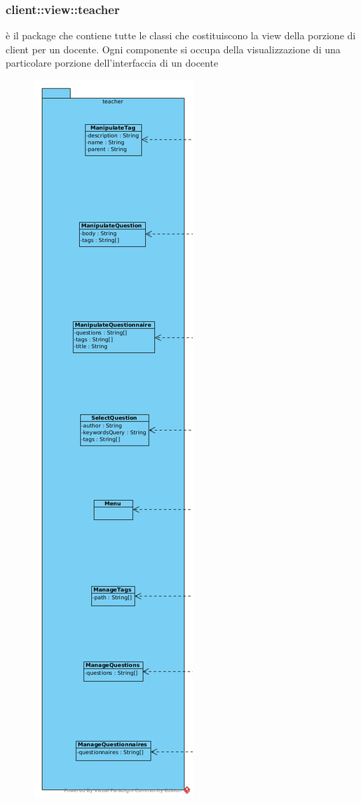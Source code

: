 \subsubsection{client::view::teacher}
è il package che contiene tutte le classi che costituiscono la view della porzione di client per un docente. Ogni componente si occupa della visualizzazione di una particolare porzione dell'interfaccia di un docente\begin{center}
		\begin{figure}[H]
			\centering \includegraphics[scale=4, max width=\textwidth, max height=\myheight]{../img/diagrammiClassi/client/view/teacher.png}

\end{figure}
\end{center}
